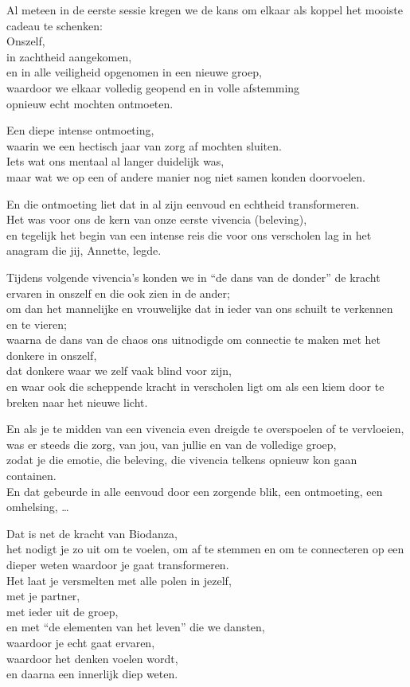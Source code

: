 \documentclass[
  11pt,
]{book}
\begin{document}
Al meteen in de eerste sessie kregen we de kans om elkaar als koppel het mooiste cadeau te schenken:\\
Onszelf,\\
in zachtheid aangekomen,\\
en in alle veiligheid opgenomen in een nieuwe groep,\\
waardoor we elkaar volledig geopend en in volle afstemming\\
opnieuw echt mochten ontmoeten.

Een diepe intense ontmoeting,\\
waarin we een hectisch jaar van zorg af mochten sluiten.\\
Iets wat ons mentaal al langer duidelijk was,\\
maar wat we op een of andere manier nog niet samen konden doorvoelen.

En die ontmoeting liet dat in al zijn eenvoud en echtheid transformeren.\\
Het was voor ons de kern van onze eerste vivencia (beleving),\\
en tegelijk het begin van een intense reis die voor ons verscholen lag in het anagram die jij, Annette, legde.

Tijdens volgende vivencia's konden we in ``de dans van de donder'' de kracht ervaren in onszelf en die ook zien in de ander;\\
om dan het mannelijke en vrouwelijke dat in ieder van ons schuilt te verkennen en te vieren;\\
waarna de dans van de chaos ons uitnodigde om connectie te maken met het donkere in onszelf,\\
dat donkere waar we zelf vaak blind voor zijn,\\
en waar ook die scheppende kracht in verscholen ligt om als een kiem door te breken naar het nieuwe licht.

En als je te midden van een vivencia even dreigde te overspoelen of te vervloeien,\\
was er steeds die zorg, van jou, van jullie en van de volledige groep,\\
zodat je die emotie, die beleving, die vivencia telkens opnieuw kon gaan containen.\\
En dat gebeurde in alle eenvoud door een zorgende blik, een ontmoeting, een omhelsing, \ldots{}

Dat is net de kracht van Biodanza,\\
het nodigt je zo uit om te voelen, om af te stemmen en om te connecteren op een dieper weten waardoor je gaat transformeren.\\
Het laat je versmelten met alle polen in jezelf,\\
met je partner,\\
met ieder uit de groep,\\
en met ``de elementen van het leven'' die we dansten,\\
waardoor je echt gaat ervaren,\\
waardoor het denken voelen wordt,\\
en daarna een innerlijk diep weten.
\end{document}
